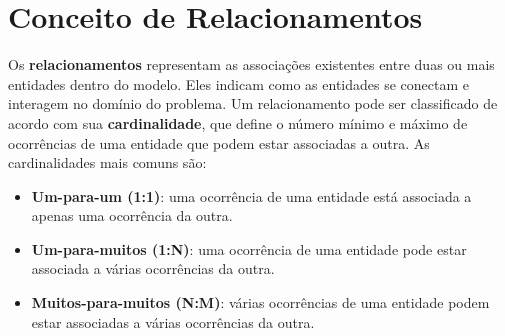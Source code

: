 \documentclass[12pt,a4paper,openright]{book}
\begin{document}
\section{Conceito de Relacionamentos}

Os \textbf{relacionamentos} representam as associações existentes entre duas ou mais entidades dentro do modelo. Eles indicam como as entidades se conectam e interagem no domínio do problema. Um relacionamento pode ser classificado de acordo com sua \textbf{cardinalidade}, que define o número mínimo e máximo de ocorrências de uma entidade que podem estar associadas a outra. As cardinalidades mais comuns são:

\begin{itemize}
    \item \textbf{Um-para-um (1:1)}: uma ocorrência de uma entidade está associada a apenas uma ocorrência da outra.
    \item \textbf{Um-para-muitos (1:N)}: uma ocorrência de uma entidade pode estar associada a várias ocorrências da outra.
    \item \textbf{Muitos-para-muitos (N:M)}: várias ocorrências de uma entidade podem estar associadas a várias ocorrências da outra.
\end{itemize}
\end{document}
